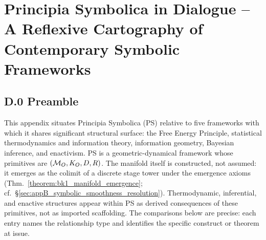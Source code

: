 \clearpage
{}
\chapter{Principia Symbolica in Dialogue – A Reflexive Cartography of Contemporary Symbolic Frameworks}
\section*{D.0 Preamble}
\label{sec:appD_preamble_nature_of_appendix}
This appendix situates Principia Symbolica (PS) relative to five frameworks with which it shares significant structural surface: the Free Energy Principle, statistical thermodynamics and information theory, information geometry, Bayesian inference, and enactivism.
PS is a geometric-dynamical framework whose primitives are $(\mathcal{M}_O, K_O, D, R)$.
The manifold itself is constructed, not assumed: it emerges as the colimit of a discrete stage tower under the emergence axioms (Thm.~\ref{theorem:bk1_manifold_emergence}; cf.~\S\ref{sec:appB_symbolic_smoothness_resolution}).
Thermodynamic, inferential, and enactive structures appear within PS as derived consequences of these primitives, not as imported scaffolding.
The comparisons below are precise: each entry names the relationship type and identifies the specific construct or theorem at issue.

